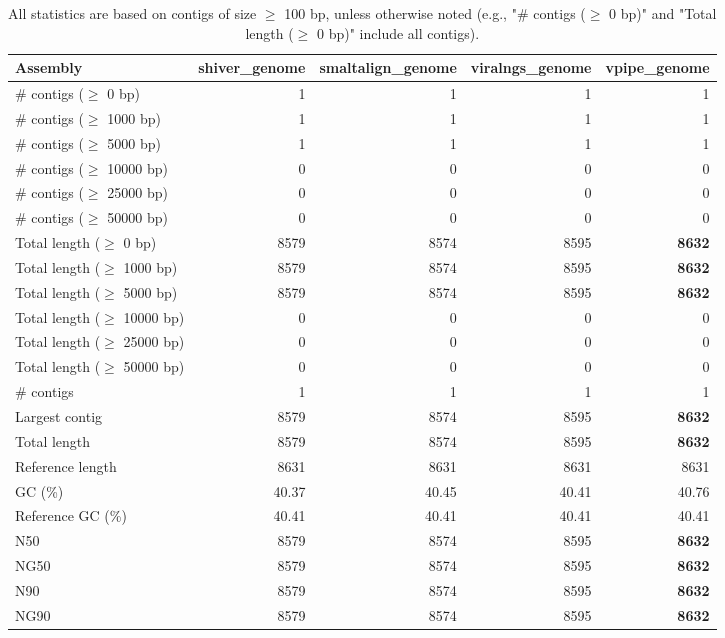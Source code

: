 \documentclass[12pt,a4paper]{article}
\begin{document}
\begin{table}[ht]
\begin{center}
\caption{All statistics are based on contigs of size $\geq$ 100 bp, unless otherwise noted (e.g., "\# contigs ($\geq$ 0 bp)" and "Total length ($\geq$ 0 bp)" include all contigs).}
\begin{tabular}{|l*{4}{|r}|}
\hline
Assembly & shiver\_genome & smaltalign\_genome & viralngs\_genome & vpipe\_genome \\ \hline
\# contigs ($\geq$ 0 bp) & 1 & 1 & 1 & 1 \\ \hline
\# contigs ($\geq$ 1000 bp) & 1 & 1 & 1 & 1 \\ \hline
\# contigs ($\geq$ 5000 bp) & 1 & 1 & 1 & 1 \\ \hline
\# contigs ($\geq$ 10000 bp) & 0 & 0 & 0 & 0 \\ \hline
\# contigs ($\geq$ 25000 bp) & 0 & 0 & 0 & 0 \\ \hline
\# contigs ($\geq$ 50000 bp) & 0 & 0 & 0 & 0 \\ \hline
Total length ($\geq$ 0 bp) & 8579 & 8574 & 8595 & {\bf 8632} \\ \hline
Total length ($\geq$ 1000 bp) & 8579 & 8574 & 8595 & {\bf 8632} \\ \hline
Total length ($\geq$ 5000 bp) & 8579 & 8574 & 8595 & {\bf 8632} \\ \hline
Total length ($\geq$ 10000 bp) & 0 & 0 & 0 & 0 \\ \hline
Total length ($\geq$ 25000 bp) & 0 & 0 & 0 & 0 \\ \hline
Total length ($\geq$ 50000 bp) & 0 & 0 & 0 & 0 \\ \hline
\# contigs & 1 & 1 & 1 & 1 \\ \hline
Largest contig & 8579 & 8574 & 8595 & {\bf 8632} \\ \hline
Total length & 8579 & 8574 & 8595 & {\bf 8632} \\ \hline
Reference length & 8631 & 8631 & 8631 & 8631 \\ \hline
GC (\%) & 40.37 & 40.45 & 40.41 & 40.76 \\ \hline
Reference GC (\%) & 40.41 & 40.41 & 40.41 & 40.41 \\ \hline
N50 & 8579 & 8574 & 8595 & {\bf 8632} \\ \hline
NG50 & 8579 & 8574 & 8595 & {\bf 8632} \\ \hline
N90 & 8579 & 8574 & 8595 & {\bf 8632} \\ \hline
NG90 & 8579 & 8574 & 8595 & {\bf 8632} \\ \hline

\end{tabular}
\end{center}
\end{table}
\end{document}
